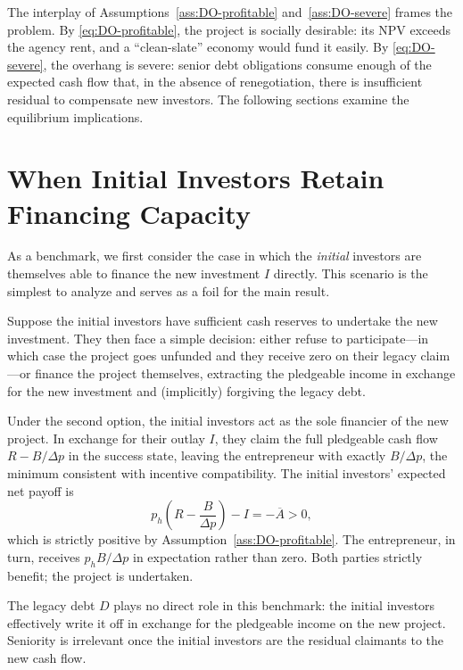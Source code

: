 \documentclass[11pt,a4paper,oneside]{book}
\theoremstyle{plain}
\theoremstyle{definition}
\theoremstyle{remark}
\numberwithin{equation}{chapter}
\begin{document}
The interplay of Assumptions~\ref{ass:DO-profitable} and~\ref{ass:DO-severe} frames the problem.
By \eqref{eq:DO-profitable}, the project is socially desirable: its NPV exceeds the agency rent, and a ``clean-slate'' economy would fund it easily.
By \eqref{eq:DO-severe}, the overhang is severe: senior debt obligations consume enough of the expected cash flow that, in the absence of renegotiation, there is insufficient residual to compensate new investors.
The following sections examine the equilibrium implications.

\section{When Initial Investors Retain Financing Capacity}
\label{sec:DO-with-cash}

As a benchmark, we first consider the case in which the \emph{initial} investors are themselves able to finance the new investment $I$ directly.
This scenario is the simplest to analyze and serves as a foil for the main result.

Suppose the initial investors have sufficient cash reserves to undertake the new investment.
They then face a simple decision: either refuse to participate---in which case the project goes unfunded and they receive zero on their legacy claim---or finance the project themselves, extracting the pledgeable income in exchange for the new investment and (implicitly) forgiving the legacy debt.

Under the second option, the initial investors act as the sole financier of the new project.
In exchange for their outlay $I$, they claim the full pledgeable cash flow $R - B/\Delta p$ in the success state, leaving the entrepreneur with exactly $B/\Delta p$, the minimum consistent with incentive compatibility.
The initial investors' expected net payoff is
\begin{equation}\label{eq:DO-initial-NPV}
  p_h \left( R - \frac{B}{\Delta p} \right) - I = -\overline{A} > 0,
\end{equation}
which is strictly positive by Assumption~\ref{ass:DO-profitable}.
The entrepreneur, in turn, receives $p_h B / \Delta p$ in expectation rather than zero.
Both parties strictly benefit; the project is undertaken.

The legacy debt $D$ plays no direct role in this benchmark: the initial investors effectively write it off in exchange for the pledgeable income on the new project.
Seniority is irrelevant once the initial investors are the residual claimants to the new cash flow.
\end{document}
